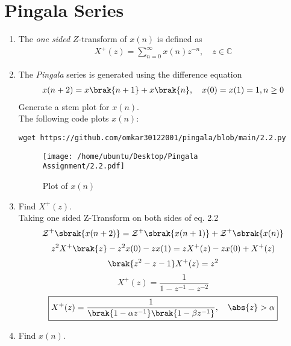 \documentclass[journal,12pt,twocolumn]{IEEEtran}
\renewcommand\thesection{\arabic{section}}
\begin{document}
\section{Pingala Series}
\begin{enumerate}[label=\thesection.\arabic*,ref=\thesection.\theenumi]
\item The {\em one sided} $Z$-transform of $x(n)$ is defined as 
\begin{align}
	X^{+}(z) = \sum_{n = 0}^{\infty}x(n)z^{-n}, \quad z \in \mathbb{C}
\label{eq:one-Z}
\end{align}
	\item The {\em Pingala} series is generated using the difference equation 
\begin{align}
	x(n+2) = x\brak{n+1} + x\brak{n},  \quad x(0) = x(1) = 1, n \ge 0
	\label{eq:10-pingala}
\end{align}
Generate a stem plot for $x(n)$. \\
\solution
The following code plots $x(n)$:
\begin{lstlisting}
wget https://github.com/omkar30122001/pingala/blob/main/2.2.py
\end{lstlisting}
\begin{figure}[!htp]
	\texttt{[image: /home/ubuntu/Desktop/Pingala Assignment/2.2.pdf]}
	\caption{Plot of $x(n)$}
	\label{fig:xn}
\end{figure}
\item 		Find $X^{+}(z)$. \\
\solution
Taking one sided Z-Transform on both sides of eq. 2.2
\begin{equation}
	\mathcal{Z}^{+}\sbrak{x(n + 2)} = \mathcal{Z}^{+}\sbrak{x(n + 1)} + \mathcal{Z}^{+}\sbrak{x(n)}
\end{equation}
\begin{equation}
	{z}^{2}X^{+}\brak{z} - z^{2}x(0) - zx(1) = zX^{+}(z) - zx(0) + X^{+}(z)
\end{equation}
\begin{equation}
	\brak{z^{2} - z - 1}X^{+}(z) = z^{2}
\end{equation}
\begin{equation}
	X^{+}(z) = \frac{1}{1 - z^{-1} - z^{-2}}
\end{equation}
\begin{equation}
	\boxed{X^{+}(z) = \frac{1}{\brak{1 - \alpha{z^{-1}}}\brak{1 - \beta{z^{-1}}}} ,\quad \abs{z} > \alpha}
\end{equation}
\item Find $x(n)$. \\

\end{enumerate}
\end{document}
